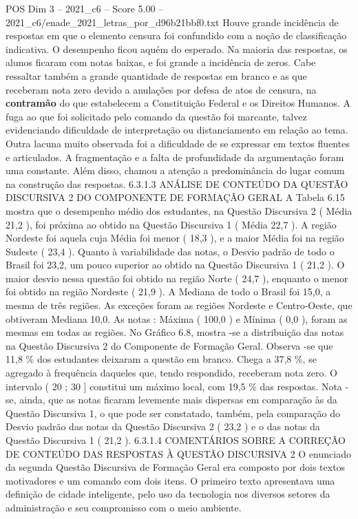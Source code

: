 \begin{textsample}{POS Dim 3 – 2021\_c6 – Score 5.00 – 2021\_c6/enade\_2021\_letras\_por\_d96b21bbf0.txt}
Houve grande incidência de respostas em que o elemento censura foi confundido com a noção de classificação indicativa.
O desempenho ficou aquém do esperado.
Na maioria das respostas, os alunos ficaram com notas baixas, e foi grande a incidência de zeros.
Cabe ressaltar também a grande quantidade de respostas em branco e as que receberam nota zero devido a anulações por defesa de atos de censura, na \textbf{contramão} do que estabelecem a Constituição Federal e os Direitos Humanos.
A fuga ao que foi solicitado pelo comando da questão foi marcante, talvez evidenciando dificuldade de interpretação ou distanciamento em relação ao tema.
Outra lacuna muito observada foi a dificuldade de se expressar em textos fluentes e articulados.
A fragmentação e a falta de profundidade da argumentação foram uma constante.
Além disso, chamou a atenção a predominância do lugar comum na construção das respostas. 6.3.1.3 ANÁLISE DE CONTEÚDO DA QUESTÃO DISCURSIVA 2 DO COMPONENTE DE FORMAÇÃO GERAL A Tabela 6.15 mostra que o desempenho médio dos estudantes, na Questão Discursiva 2 ( Média 21,2 ), foi próxima ao obtido na Questão Discursiva 1 ( Média 22,7 ).
A região Nordeste foi aquela cuja Média foi menor ( 18,3 ), e a maior Média foi na região Sudeste ( 23,4 ).
Quanto à variabilidade das notas, o Desvio padrão de todo o Brasil foi 23,2, um pouco superior ao obtido na Questão Discursiva 1 ( 21,2 ).
O maior desvio nessa questão foi obtido na região Norte ( 24,7 ), enquanto o menor foi obtido na região Nordeste ( 21,9 ).
A Mediana de todo o Brasil foi 15,0, a mesma de três regiões.
As exceções foram as regiões Nordeste e Centro-Oeste, que obtiveram Mediana 10,0.
As notas : Máxima ( 100,0 ) e Mínima ( 0,0 ), foram as mesmas em todas as regiões.
No Gráfico 6.8, mostra -se a distribuição das notas na Questão Discursiva 2 do Componente de Formação Geral.
Observa -se que 11,8 \% dos estudantes deixaram a questão em branco.
Chega a 37,8 \%, se agregado à frequência daqueles que, tendo respondido, receberam nota zero.
O intervalo ( 20 ; 30 ] constitui um máximo local, com 19,5 \% das respostas.
Nota -se, ainda, que as notas ficaram levemente mais dispersas em comparação às da Questão Discursiva 1, o que pode ser constatado, também, pela comparação do Desvio padrão das notas da Questão Discursiva 2 ( 23,2 ) e o das notas da Questão Discursiva 1 ( 21,2 ). 6.3.1.4 COMENTÁRIOS SOBRE A CORREÇÃO DE CONTEÚDO DAS RESPOSTAS À QUESTÃO DISCURSIVA 2 O enunciado da segunda Questão Discursiva de Formação Geral era composto por dois textos motivadores e um comando com dois itens.
O primeiro texto apresentava uma definição de cidade inteligente, pelo uso da tecnologia nos diversos setores da administração e seu compromisso com o meio ambiente.

\end{textsample}
